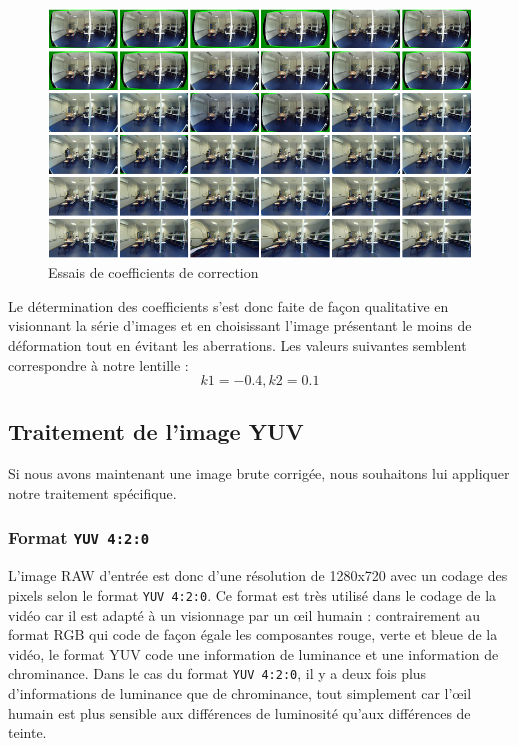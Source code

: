 \documentclass[11pt,a4paper]{article}
\begin{document}
\bigbreak
\bigbreak
\begin{figure}[H]
\begin{center}
\includegraphics[scale=0.3]{images/fisheye_tries.png}
\end{center}
\caption{Essais de coefficients de correction}
\label{}
\end{figure}
\bigbreak

\bigbreak
Le détermination des coefficients s'est donc faite de façon qualitative en visionnant la série d'images et en choisissant l'image présentant le moins de déformation tout en évitant les aberrations.
Les valeurs suivantes semblent correspondre à notre lentille :
$$k1 = -0.4, k2 = 0.1$$

\subsection{Traitement de l'image YUV}
Si nous avons maintenant une image brute corrigée, nous souhaitons lui appliquer notre traitement spécifique.

\subsubsection{Format \texttt{YUV 4:2:0}}
L'image RAW d'entrée est donc d'une résolution de 1280x720 avec un codage des pixels selon le format \texttt{YUV 4:2:0}.
Ce format est très utilisé dans le codage de la vidéo car il est adapté à un visionnage par un œil humain : contrairement au format RGB qui code de façon égale les composantes rouge, verte et bleue de la vidéo, le format YUV code une information de luminance et une information de chrominance.
Dans le cas du format \texttt{YUV 4:2:0}, il y a deux fois plus d'informations de luminance que de chrominance, tout simplement car l'œil humain est plus sensible aux différences de luminosité qu'aux différences de teinte.
\end{document}
